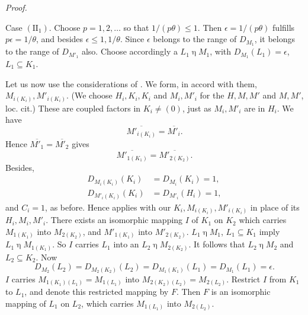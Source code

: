\documentclass[b5paper,twoside]{article}
\theoremstyle{mvnplain}
\renewenvironment{proof}[1][Proof]{%
  \par\addvspace{0.35\baselineskip}%
  \noindent\textit{#1.}\ \normalfont\ignorespaces
}{%
  \par\addvspace{0.35\baselineskip}%
}
\newcommand{\M}{\mathbf M}
\newcommand{\Hilbert}{\mathfrak H}
\def\M{M}%
\def\Hilbert{H}%
\def\mathfrak#1{#1}%
\begin{document}
\begin{proof}
{Case \((\mathrm {II}_1)\). Choose \(p=1,2,\ldots\) so that
\(1/(p\theta)\leq1\). Then \(\epsilon=1/(p\theta)\) fulfills
\(p\epsilon=1/\theta\), and besides \(\epsilon\leq1,1/\theta\). Since
\(\epsilon\) belongs to the range of \(D_{\M_1}\), it belongs to the range
of \(D_{\M'_1}\) also.} Choose accordingly a
\(\mathfrak L_1\mathrel{\eta}\M_1\), with
\(D_{\M_1}(\mathfrak L_1)=\epsilon\),
\(\mathfrak L_1\subseteq\mathfrak K_1\).

Let us now use the considerations of \cite[pp.~188--190, \S11.4]{ref5}. We
form, in accord with them,
\(\M_{i(\mathfrak K_i)},\M'_{i(\mathfrak K_i)}\). (We choose
\(\Hilbert_i,\mathfrak K_i,\mathfrak K_i\) and \(\M_i,\M'_i\) for the
\(\Hilbert,\mathfrak M,\mathfrak M'\) and \(\M,\M'\), loc. cit.) These are
coupled factors in \(\mathfrak K_i\ne(0)\), just as \(\M_i,\M'_i\) are in
\(\Hilbert_i\). We have
\[
  \overline{\M'_{i(\mathfrak K_i)}}=\overline{\M'_i}.
\]
Hence \(\overline{\M'_1}=\overline{\M'_2}\) gives
\[
  \overline{\M'_{1(\mathfrak K_1)}}
  =\overline{\M'_{2(\mathfrak K_2)}}.
\]
Besides,
\[
\begin{aligned}
D_{\M_i(\mathfrak K_i)}(\mathfrak K_i)&=D_{\M_i}(\mathfrak K_i)=1,\\
D_{\M'_i(\mathfrak K_i)}(\mathfrak K_i)&=D_{\M'_i}(\Hilbert_i)=1,
\end{aligned}
\]
and \(C_i=1\), as before. Hence \cite[p.~244, Theorem~XI]{ref6} applies with
our \(\mathfrak K_i,\M_{i(\mathfrak K_i)},\M'_{i(\mathfrak K_i)}\) in place
of its \(\Hilbert_i,\M_i,\M'_i\). There exists an isomorphic mapping
\(\mathfrak I\) of \(\mathfrak K_1\) on \(\mathfrak K_2\) which carries
\(\M_{1(\mathfrak K_1)}\) into \(\M_{2(\mathfrak K_2)}\), and
\(\M'_{1(\mathfrak K_1)}\) into \(\M'_{2(\mathfrak K_2)}\).
\(\mathfrak L_1\mathrel{\eta}\M_1\),
\(\mathfrak L_1\subseteq\mathfrak K_1\) imply
\(\mathfrak L_1\mathrel{\eta}\M_{1(\mathfrak K_1)}\). So \(\mathfrak I\) carries
\(\mathfrak L_1\) into an \(\mathfrak L_2\mathrel{\eta}\M_{2(\mathfrak K_2)}\). It
follows that \(\mathfrak L_2\mathrel{\eta}\M_2\) and
\(\mathfrak L_2\subseteq\mathfrak K_2\). Now
\[
  D_{\M_2}(\mathfrak L_2)
  =D_{\M_2(\mathfrak K_2)}(\mathfrak L_2)
  =D_{\M_1(\mathfrak K_1)}(\mathfrak L_1)
  =D_{\M_1}(\mathfrak L_1)=\epsilon.
\]
\(\mathfrak I\) carries
\(\M_{1(\mathfrak K_1)(\mathfrak L_1)}=\M_{1(\mathfrak L_1)}\) into
\(\M_{2(\mathfrak K_2)(\mathfrak L_2)}=\M_{2(\mathfrak L_2)}\). Restrict
\(\mathfrak I\) from \(\mathfrak K_1\) to \(\mathfrak L_1\), and denote
this restricted mapping by \(\mathfrak F\). Then \(\mathfrak F\) is an
isomorphic mapping of \(\mathfrak L_1\) on \(\mathfrak L_2\), which carries
\(\M_{1(\mathfrak L_1)}\) into \(\M_{2(\mathfrak L_2)}\).


\end{proof}
\end{document}
